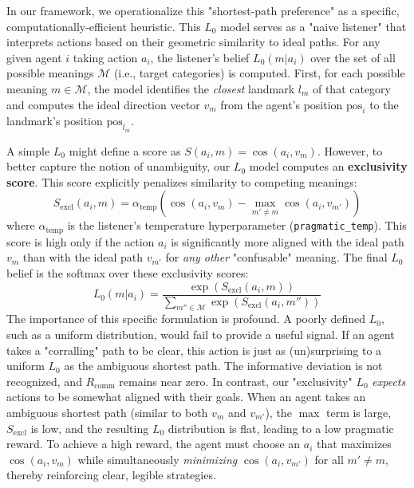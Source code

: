 \documentclass[12pt, a4paper]{report}
\newcommand{\Rcomm}{R_{\text{comm}}}
\begin{document}
In our framework, we operationalize this "shortest-path preference" as a specific, computationally-efficient heuristic. This $L_0$ model serves as a "naive listener" that interprets actions based on their geometric similarity to ideal paths. For any given agent $i$ taking action $a_i$, the listener's belief $L_0(m|a_i)$ over the set of all possible meanings $\mathcal{M}$ (i.e., target categories) is computed. First, for each possible meaning $m \in \mathcal{M}$, the model identifies the \textit{closest} landmark $l_m$ of that category and computes the ideal direction vector $v_m$ from the agent's position $\text{pos}_i$ to the landmark's position $\text{pos}_{l_m}$.

A simple $L_0$ might define a score as $S(a_i, m) = \cos(a_i, v_m)$. However, to better capture the notion of unambiguity, our $L_0$ model computes an \textbf{exclusivity score}. This score explicitly penalizes similarity to competing meanings:
$$ S_{\text{excl}}(a_i, m) = \alpha_{\text{temp}} \left( \cos(a_i, v_m) - \max_{m' \neq m} \cos(a_i, v_{m'}) \right) $$
where $\alpha_{\text{temp}}$ is the listener's temperature hyperparameter (\texttt{pragmatic\_temp}). This score is high only if the action $a_i$ is significantly more aligned with the ideal path $v_m$ than with the ideal path $v_{m'}$ for \textit{any other} "confusable" meaning. The final $L_0$ belief is the softmax over these exclusivity scores:
$$ L_0(m | a_i) = \frac{\exp(S_{\text{excl}}(a_i, m))}{\sum_{m'' \in \mathcal{M}} \exp(S_{\text{excl}}(a_i, m''))} $$
The importance of this specific formulation is profound. A poorly defined $L_0$, such as a uniform distribution, would fail to provide a useful signal. If an agent takes a "corralling" path to be clear, this action is just as (un)surprising to a uniform $L_0$ as the ambiguous shortest path. The informative deviation is not recognized, and $\Rcomm$ remains near zero. In contrast, our "exclusivity" $L_0$ \textit{expects} actions to be somewhat aligned with their goals. When an agent takes an ambiguous shortest path (similar to both $v_m$ and $v_{m'}$), the $\max$ term is large, $S_{\text{excl}}$ is low, and the resulting $L_0$ distribution is flat, leading to a low pragmatic reward. To achieve a high reward, the agent must choose an $a_i$ that maximizes $\cos(a_i, v_m)$ while simultaneously \textit{minimizing} $\cos(a_i, v_{m'})$ for all $m' \neq m$, thereby reinforcing clear, legible strategies.
\end{document}
